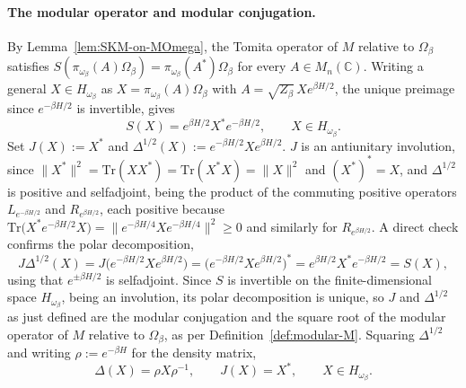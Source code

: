 \paragraph{The modular operator and modular conjugation.}
By Lemma~\ref{lem:SKM-on-MOmega}, the Tomita operator of $M$ relative to $\Omega_\beta$ satisfies $S(\pi_{\omega_\beta}(A)\Omega_\beta) = \pi_{\omega_\beta}(A^*)\Omega_\beta$ for every $A \in M_n(\mathbb{C})$. Writing a general $X \in H_{\omega_\beta}$ as $X = \pi_{\omega_\beta}(A)\Omega_\beta$ with $A = \sqrt{Z_\beta}\,Xe^{\beta H/2}$, the unique preimage since $e^{-\beta H/2}$ is invertible, gives
\begin{equation}\label{eq:S-gibbs}
	S(X) = e^{\beta H/2}X^*e^{-\beta H/2}, \qquad X \in H_{\omega_\beta}.
\end{equation}
Set $J(X) := X^*$ and $\Delta^{1/2}(X) := e^{-\beta H/2}Xe^{\beta H/2}$. $J$ is an antiunitary involution, since $\|X^*\|^2 = \mathrm{Tr}(XX^*) = \mathrm{Tr}(X^*X) = \|X\|^2$ and $(X^*)^*=X$, and $\Delta^{1/2}$ is positive and selfadjoint, being the product of the commuting positive operators $L_{e^{-\beta H/2}}$ and $R_{e^{\beta H/2}}$, each positive because $\mathrm{Tr}\big(X^*e^{-\beta H/2}X\big) = \|e^{-\beta H/4}Xe^{-\beta H/4}\|^2 \geq 0$ and similarly for $R_{e^{\beta H/2}}$. A direct check confirms the polar decomposition,
\[
J\Delta^{1/2}(X) = J\big(e^{-\beta H/2}Xe^{\beta H/2}\big) = \big(e^{-\beta H/2}Xe^{\beta H/2}\big)^* = e^{\beta H/2}X^*e^{-\beta H/2} = S(X),
\]
using that $e^{\pm\beta H/2}$ is selfadjoint. Since $S$ is invertible on the finite-dimensional space $H_{\omega_\beta}$, being an involution, its polar decomposition is unique, so $J$ and $\Delta^{1/2}$ as just defined are the modular conjugation and the square root of the modular operator of $M$ relative to $\Omega_\beta$, as per Definition~\ref{def:modular-M}. Squaring $\Delta^{1/2}$ and writing $\rho := e^{-\beta H}$ for the density matrix,
\begin{equation}\label{eq:Delta-gibbs}
	\Delta(X) = \rho X \rho^{-1}, \qquad J(X) = X^*, \qquad X \in H_{\omega_\beta}.
\end{equation}

